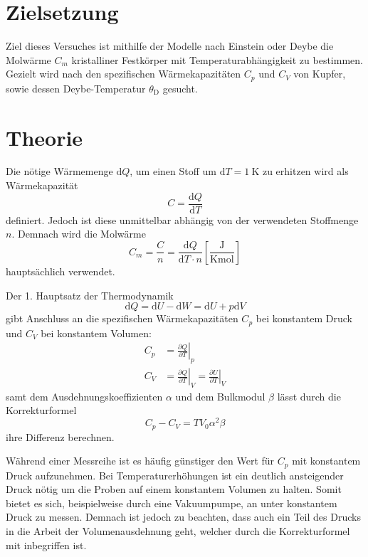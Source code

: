 \section{Zielsetzung}
\label{sec:Zielsetzung}
Ziel dieses Versuches ist mithilfe der Modelle nach Einstein oder Deybe die Molwärme $C_m$ kristalliner Festkörper mit Temperaturabhängigkeit zu bestimmen.
Gezielt wird nach den spezifischen Wärmekapazitäten $C_p$ und $C_V$ von Kupfer, sowie dessen Deybe-Temperatur $\theta_\text{D}$ gesucht.

\section{Theorie}
\label{sec:Theorie}
Die nötige Wärmemenge $\text{d}Q$, um einen Stoff um $\text{d}T = \SI{1}{\kelvin}$ zu erhitzen wird als Wärmekapazität
\begin{equation}
    C = \frac{\text{d}Q}{\text{d}T}
\end{equation}
definiert.
Jedoch ist diese unmittelbar abhängig von der verwendeten Stoffmenge $n$. Demnach wird die Molwärme 
\begin{equation}
    C_m = \frac{C}{n} = \frac{\text{d}Q}{\text{d}T \cdot n} \left[\frac{\si{\joule}}{\si{\kelvin\mol}}\right]
\end{equation}
hauptsächlich verwendet.

Der 1. Hauptsatz der Thermodynamik
\begin{equation}
 \text{d}Q = \text{d}U - \text{d}W = \text{d}U + p\text{d}V
\end{equation}
gibt Anschluss an die spezifischen Wärmekapazitäten $C_p$ bei konstantem Druck und $C_V$ bei konstantem Volumen:
\begin{align}
    C_p &= \left. \frac{\partial Q}{\partial T}\right|_p \\
    C_V &= \left. \frac{\partial Q}{\partial T}\right|_V = \left. \frac{\partial U}{\partial T}\right|_V
    \label{eq:C_V}
\end{align}
samt dem Ausdehnungskoeffizienten $\alpha$ und dem Bulkmodul $\beta$
lässt durch die Korrekturformel
\begin{equation}
    C_p - C_V = T V_0 \alpha^2 \beta
    \label{eq:korrekt}
\end{equation}
ihre Differenz berechnen.

Während einer Messreihe ist es häufig günstiger den Wert für $C_p$ mit konstantem Druck aufzunehmen.
Bei Temperaturerhöhungen ist ein deutlich ansteigender Druck nötig um die Proben auf einem konstantem Volumen zu halten.
Somit bietet es sich, beispielweise durch eine Vakuumpumpe, an unter konstantem Druck zu messen. 
Demnach ist jedoch zu beachten, dass auch ein Teil des Drucks in die Arbeit der Volumenausdehnung geht,
welcher durch die Korrekturformel mit inbegriffen ist.

